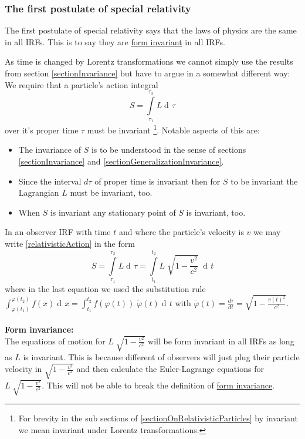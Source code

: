 \documentclass{article}
\DeclareMathOperator{\dd}{d\!}
\begin{document}
\subsubsection{The first postulate of special relativity} \label{sectionFirstPostulate}
The first postulate of special relativity says that the laws of physics are the same in all IRFs.
This is to say they are \hyperlink{hrefDefintionFormInvariance}{form invariant} in all IRFs.

As time is changed by Lorentz transformations we cannot simply use the results from section \ref{sectionInvariance} but have to argue in a somewhat different way:
We require that a particle's action integral
\begin{equation} \label{relativisticAction}
    S = \int\limits_{\tau_1}^{\tau_2} L \dd \tau
\end{equation}
over it's proper time $\tau$ must be invariant
\footnote{For brevity in the sub sections of \ref{sectionOnRelativisticParticles} by invariant we mean invariant under Lorentz transformations.}.
Notable aspects of this are:
\begin{itemize}
    \item The invariance of $S$ is to be understood in the sense of sections \ref{sectionInvariance} and \ref{sectionGeneralizationInvariance}.
    \item Since the interval $d  \tau$ of proper time is invariant then for $S$ to be invariant the Lagrangian $L$ must be invariant, too.
    \item When $S$ is invariant any stationary point of $S$ is invariant, too.
\end{itemize}
In an observer IRF with time $t$ and where the particle's velocity is $v$ we may write \ref{relativisticAction} in the form
\begin{equation} \label{relativisticActionWithObserver}
    S = \int\limits_{\tau_1}^{\tau_2} L \dd \tau = \int\limits_{t_1}^{t_2} L \; \sqrt{1-\frac{v^2}{c^2}} \; \dd t
\end{equation}
where in the last equation we used the substitution rule $\int_{\varphi(t_1)}^{\varphi(t_2)} f(x) \dd x = \int_{t_1}^{t_2} f(\varphi(t)) \; \dot{\varphi}(t) \dd t$ with $\dot{\varphi}(t)= \frac{d \tau}{d t} = \sqrt{1-\frac{v(t)^2}{c^2}}$.
\\
\\
\textbf{Form invariance:}\\
The equations of motion for $L \; \sqrt{1-\frac{v^2}{c^2}}$ will be form invariant in all IRFs as long as $L$ is invariant.
This is because different of observers will just plug their particle velocity in $\sqrt{1-\frac{v^2}{c^2}}$ and then calculate the Euler-Lagrange equations for $L \; \sqrt{1-\frac{v^2}{c^2}}$.
This will not be able to break the definition of \hyperlink{hrefDefintionFormInvariance}{form invariance}.
\end{document}
